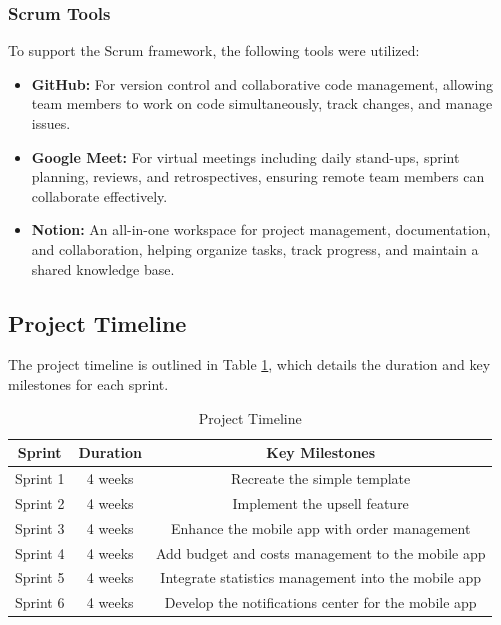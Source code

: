 \subsubsection{Scrum Tools}
To support the Scrum framework, the following tools were utilized:
\begin{itemize}
    \item \textbf{GitHub:} For version control and collaborative code management, allowing team members to work on code simultaneously, track changes, and manage issues.
    \item \textbf{Google Meet:} For virtual meetings including daily stand-ups, sprint planning, reviews, and retrospectives, ensuring remote team members can collaborate effectively.
    \item \textbf{Notion:} An all-in-one workspace for project management, documentation, and collaboration, helping organize tasks, track progress, and maintain a shared knowledge base.
\end{itemize}

\subsection{Project Timeline}
The project timeline is outlined in Table \ref{tab:project_timeline}, which details the duration and key milestones for each sprint.

\begin{table}[h]
  \centering
  \begin{tabular}{|c|c|c|}
    \hline
    \textbf{Sprint} & \textbf{Duration} & \textbf{Key Milestones} \\
    \hline
    Sprint 1 & 4 weeks & Recreate the simple template \\
    \hline
    Sprint 2 & 4 weeks & Implement the upsell feature \\
    \hline
    Sprint 3 & 4 weeks & Enhance the mobile app with order management \\
    \hline
    Sprint 4 & 4 weeks & Add budget and costs management to the mobile app \\
    \hline
    Sprint 5 & 4 weeks & Integrate statistics management into the mobile app \\
    \hline
    Sprint 6 & 4 weeks & Develop the notifications center for the mobile app \\
    \hline
  \end{tabular}
  \caption{Project Timeline}
  \label{tab:project_timeline}
\end{table}

